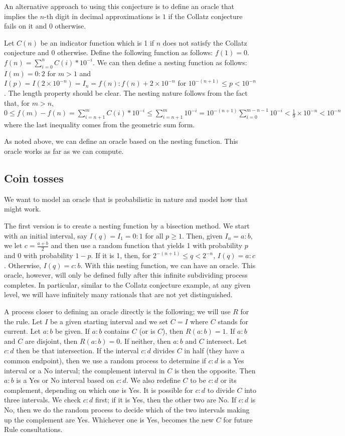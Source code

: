 \documentclass[12pt]{article}
\theoremstyle{remark}
\begin{document}
An alternative approach to using this conjecture is to define an oracle that implies the $n$-th digit in decimal approximations is $1$ if the Collatz conjecture fails on it and $0$ otherwise.

Let $C(n)$ be an indicator function which is 1 if $n$ does not satisfy the Collatz conjecture and 0 otherwise. Define the following function as follows: $f(1) = 0$. $f(n) = \sum_{i=0}^n C(i)*10^{-i} $.  We can then define a nesting function as follows: $I(m)=0:2$ for $m > 1$ and $I(p) = I(2 \times 10^{-n}) = I_n = f(n): f(n)+2 \times 10^{-n}$ for $10^{-(n+1)} \leq p < 10^{-n}$. The length property should be clear. The nesting nature follows from the fact that, for $m > n$,  $0 \leq  f(m)-f(n) = \sum_{i=n+1}^m C(i)*10^{-i} \leq \sum_{i=n+1}^m 10^{-i} = 10^{-(n+1)}\sum_{i=0}^{m-n-1} 10^{-i} < \tfrac{1}{9} \times 10^{-n} < 10^{-n} $ where the last inequality comes from the geometric sum form.

As noted above, we can define an oracle based on the nesting function. This oracle works as far as we can compute. 


\subsection{Coin tosses}

We want to model an oracle that is probabilistic in nature and model how that might work. 

The first version is to create a nesting function by a bisection method. We start with an initial interval, say $I(q) = I_1 = 0:1$ for all $p\geq 1$. Then, given $I_n = a:b$, we let $c = \tfrac{a+b}{2}$ and then use a random function that yields 1 with probability $p$ and 0 with probability $1-p$. If it is 1, then, for $2^{-(n+1)} \leq q  < 2^{-n}$, $I(q) = a:c$. Otherwise, $I(q) = c:b$. With this nesting function, we can have an oracle. This oracle, however, will only be defined fully after this infinite subdividing process completes. In particular, similar to the Collatz conjecture example, at any given level, we will have infinitely many rationals that are not yet distinguished.  

A process closer to defining an oracle directly is the following; we will use $R$ for the rule. Let $I$ be a given starting interval and we set $C=I$ where $C$ stands for current. Let $a:b$ be given. If $a:b$ contains $C$ (or is $C$), then $R(a:b) = 1$. If $a:b$ and $C$ are disjoint, then $R(a:b) = 0$. If neither, then $a:b$ and $C$ intersect. Let $c:d$ then be that intersection. If the interval $c:d$ divides $C$ in half (they have a common endpoint), then we use a random process to determine if $c:d$ is a Yes interval or a No interval; the complement interval in $C$ is then the opposite. Then $a:b$ is a Yes or No interval based on $c:d$. We also redefine $C$ to be $c:d$ or its complement, depending on which one is Yes. It is possible for $c:d$ to divide $C$ into three intervals. We check $c:d$ first; if it is Yes, then the other two are No. If $c:d$ is No, then we do the random process to decide which of the two intervals making up the complement are Yes. Whichever one is Yes, becomes the new $C$ for future Rule consultations.  
\end{document}
